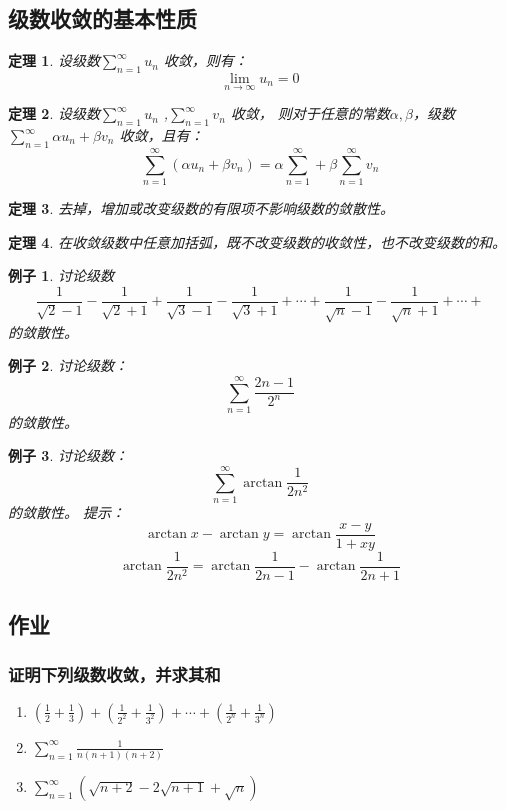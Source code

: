 \documentclass[a4paper,12pt]{article}
\newtheorem{theorem}{定理}
\newtheorem{example}{例子}
\begin{document}
\subsection{级数收敛的基本性质}
\begin{theorem}
    设级数$\displaystyle \sum_{n=1}^{\infty} u_n$ 收敛，则有：
    \[
        \lim_{n \to \infty} u_n = 0
        \]
\end{theorem}
\begin{theorem}
    设级数$\displaystyle \sum_{n=1}^{\infty} u_n$ ,$\displaystyle \sum_{n=1}^{\infty} v_n$ 收敛，
    则对于任意的常数$\alpha, \beta$，级数$\displaystyle \sum_{n=1}^{\infty} \alpha u_n + \beta v_n$ 
    收敛，且有：
    \[
        \displaystyle \sum_{n=1}^{\infty}  \left(\alpha u_n + \beta v_n  \right) 
        =\alpha \sum_{n=1}^{\infty} + \beta \sum_{n=1}^{\infty} v_n
        \]
\end{theorem}
\begin{theorem}
    去掉，增加或改变级数的有限项不影响级数的敛散性。
\end{theorem}
\begin{theorem}
    在收敛级数中任意加括弧，既不改变级数的收敛性，也不改变级数的和。
\end{theorem}

\begin{example}
    讨论级数
    \[
        \frac{1}{\sqrt{2} - 1} - \frac{1}{\sqrt{2} + 1} + 
        \frac{1}{\sqrt{3} - 1} - \frac{1}{\sqrt{3} + 1} + 
        \cdots + \frac{1}{\sqrt{n} - 1} - \frac{1}{\sqrt{n} + 1} + 
        \cdots +
        \]
    的敛散性。
\end{example}

\begin{example}
    讨论级数：
    \[
        \sum_{n=1}^{\infty} \frac{2n - 1}{2^n}
        \]
    的敛散性。
\end{example}
\begin{example}
    讨论级数：
    \[
        \sum_{n=1}^{\infty} \arctan\frac{1}{2n^2}
        \]
    的敛散性。
    提示：
    \[
        \arctan x - \arctan y = \arctan \frac{x - y}{1 + xy}
        \]
    \[
        \arctan \frac{1}{2n^2} = \arctan \frac{1}{2n-1} - 
        \arctan \frac{1}{2n + 1}
        \]
\end{example}

\subsection{作业}
\subsubsection{证明下列级数收敛，并求其和}
\begin{enumerate}[label={\rm(\arabic*)}]
    \item $\displaystyle \left(\frac{1}{2} + \frac{1}{3}\right) + 
        \left(\frac{1}{2^2} + \frac{1}{3^2}\right) + \cdots + 
        \left(\frac{1}{2^n} + \frac{1}{3^n}\right)$
    \item$ \displaystyle \sum_{n=1}^{\infty} \frac{1}{n(n+1)(n+2)}$ 
    \item$ \displaystyle \sum_{n=1}^{\infty} \left(\sqrt{n+2} - 2\sqrt{n+1}
        + \sqrt{n} \right)$ 
\end{enumerate}
\end{document}
